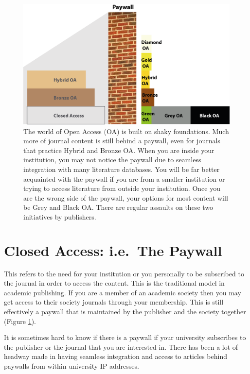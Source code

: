 \documentclass[
]{krantz}
\begin{document}
\begin{figure}
\includegraphics[width=0.95\linewidth]{figures/Paywall-graphic} \caption{The world of Open Access (OA) is built on shaky foundations. Much more of journal content is still behind a paywall, even for journals that practice Hybrid and Bronze OA. When you are inside your institution, you may not notice the paywall due to seamless integration with many literature databases. You will be far better acquainted with the paywall if you are from a smaller institution or trying to access literature from outside your institution. Once you are the wrong side of the paywall, your options for most content will be Grey and Black OA. There are regular assaults on these two initiatives by publishers.}\label{fig:Paywall-graphic}
\end{figure}

\hypertarget{closed-access-i.e.-the-paywall}{%
\section{Closed Access: i.e.~The Paywall}\label{closed-access-i.e.-the-paywall}}

This refers to the need for your institution or you personally to be subscribed to the journal in order to access the content. This is the traditional model in academic publishing. If you are a member of an academic society then you may get access to their society journals through your membership. This is still effectively a paywall that is maintained by the publisher and the society together (Figure \ref{fig:Paywall-graphic}).

It is sometimes hard to know if there is a paywall if your university subscribes to the publisher or the journal that you are interested in. There has been a lot of headway made in having seamless integration and access to articles behind paywalls from within university IP addresses.
\end{document}
